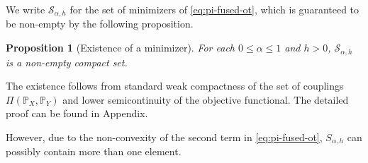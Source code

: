 \documentclass{article}
\newtheorem{proposition}{Proposition}
\begin{document}
We write $\mathcal{S}_{\alpha,h}$ for the set of minimizers of \eqref{eq:pi-fused-ot}, which is guaranteed to be non-empty by the following proposition.
\begin{proposition}[Existence of a minimizer]
	\label{prop:existence}
	For each $0\le \alpha\le 1$ and $h > 0$, $\mathcal{S}_{\alpha,h}$ is a non-empty compact set.
\end{proposition}
The existence follows from standard weak compactness of the set of couplings $\Pi(\mathbb{P}_X,\mathbb{P}_Y)$ and lower semicontinuity of the objective functional. The detailed proof can be found in Appendix. 

However, due to the non-convexity of the second term in \eqref{eq:pi-fused-ot}, $S_{\alpha,h}$ can possibly contain more than one element.




\end{document}
